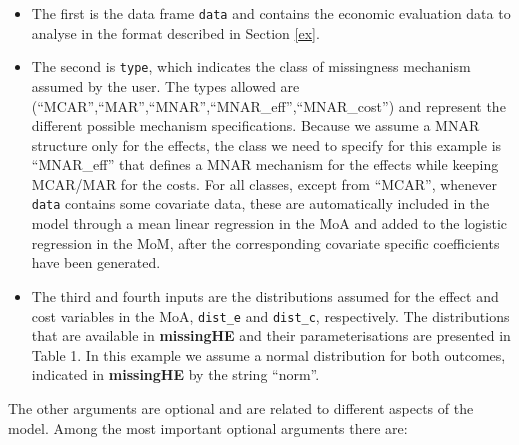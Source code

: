 \documentclass[]{article}
\begin{document}
\begin{itemize}
\item
  The first is the data frame \texttt{data} and contains the economic
  evaluation data to analyse in the format described in Section
  \ref{ex}.
\item
  The second is \texttt{type}, which indicates the class of missingness
  mechanism assumed by the user. The types allowed are
  (``MCAR'',``MAR'',``MNAR'',``MNAR\_eff'',``MNAR\_cost'') and represent
  the different possible mechanism specifications. Because we assume a
  MNAR structure only for the effects, the class we need to specify for
  this example is ``MNAR\_eff'' that defines a MNAR mechanism for the effects
  while keeping MCAR/MAR for the costs. For all classes, except from
  ``MCAR'', whenever \texttt{data} contains some covariate data, these
  are automatically included in the model through a mean linear
  regression in the MoA and added to the logistic regression in the MoM,
  after the corresponding covariate specific coefficients have been
  generated.
\item
  The third and fourth inputs are the distributions assumed for the
  effect and cost variables in the MoA, \texttt{dist\_e} and
  \texttt{dist\_c}, respectively. The distributions that are available
  in \textbf{missingHE} and their parameterisations are presented in
  Table 1. In this example we assume a normal distribution for both
  outcomes, indicated in \textbf{missingHE} by the string ``norm''.
\end{itemize}

The other arguments are optional and are related to different aspects of
the model. Among the most important optional arguments there are:
\end{document}
